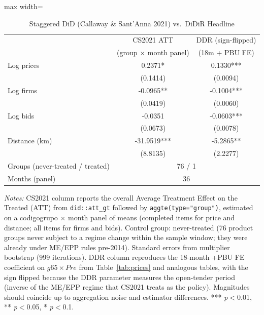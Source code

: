 \begin{table}[htbp]
\centering
\caption{Staggered DiD (Callaway \& Sant'Anna 2021) vs.~DiDiR Headline}
\label{tab:cs2021}
\begin{adjustbox}{max width=\textwidth}
\begin{threeparttable}
\small
\begin{tabular}{lcc}
\toprule
 & CS2021 ATT & DDR (sign-flipped) \\
 & (group $\times$ month panel) & (18m + PBU FE) \\
\midrule
Log prices & 0.2371* & 0.1330*** \\
 & (0.1414) & (0.0094) \\
Log firms & -0.0965** & -0.1004*** \\
 & (0.0419) & (0.0060) \\
Log bids & -0.0351 & -0.0603*** \\
 & (0.0673) & (0.0078) \\
Distance (km) & -31.9519*** & -5.2865** \\
 & (8.8135) & (2.2277) \\
\midrule
Groups (never-treated / treated) & \multicolumn{2}{c}{76 / 1} \\
Months (panel) & \multicolumn{2}{c}{36} \\
\bottomrule
\end{tabular}
\begin{tablenotes}
\small
\item \textit{Notes:} CS2021 column reports the overall Average Treatment
Effect on the Treated (ATT) from \texttt{did::att\_gt} followed by
\texttt{aggte(type="group")}, estimated on a codigogrupo $\times$ month
panel of means (completed items for price and distance; all items for firms
and bids). Control group: never-treated (76 product groups never subject to
a regime change within the sample window; they were already under ME/EPP
rules pre-2014). Standard errors from multiplier bootstrap (999 iterations).
DDR column reproduces the 18-month +PBU FE coefficient on $g65 \times Pre$
from Table~\ref{tab:prices} and analogous tables, with the sign flipped
because the DDR parameter measures the open-tender period (inverse of the
ME/EPP regime that CS2021 treats as the policy). Magnitudes should coincide
up to aggregation noise and estimator differences.
*** \textit{p}$<$0.01, ** \textit{p}$<$0.05, * \textit{p}$<$0.1.
\end{tablenotes}
\end{threeparttable}
\end{adjustbox}
\end{table}
